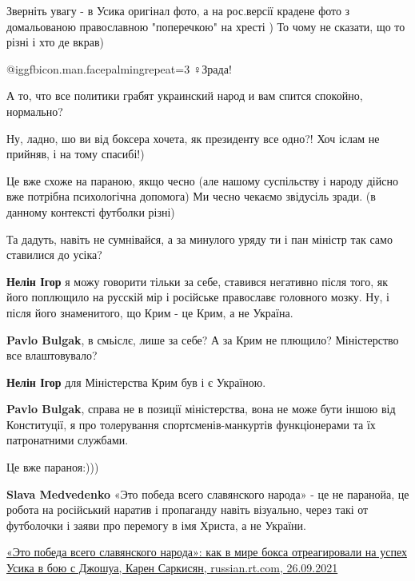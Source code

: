 \begin{itemize}
Зверніть увагу - в Усика оригінал фото, а на рос.версії крадене фото з
домальованою православною "поперечкою" на хресті ) То чому не сказати, що то
різні і хто де вкрав)

 @igg{fbicon.man.facepalming}{repeat=3} ♀️Зрада!

А то, что все политики грабят украинский народ и вам спится спокойно, нормально?


Ну, ладно, шо ви від боксера хочета, як президенту все одно?! Хоч іслам не прийняв, і на тому спасибі!)



Це вже схоже на параною, якщо чесно (але нашому суспільству і народу дійсно вже потрібна психологічна допомога)
Ми чесно чекаємо звідусіль зради. (в данному контексті футболки різні)


Та дадуть, навіть не сумнівайся, а за минулого уряду ти і пан міністр так само
ставилися до усіка?

\begin{itemize} %
\textbf{Нелін Ігор} я можу говорити тільки за себе, ставився негативно після того, як його поплющило на русскій мір і російське православє головного мозку. Ну, і після його знаменитого, що Крим - це Крим, а не Україна.

\textbf{Pavlo Bulgak}, в смьіслє, лише за себе? А за Крим не плющило? Міністерство все влаштовувало?

\textbf{Нелін Ігор} для Міністерства Крим був і є Україною.

\textbf{Pavlo Bulgak}, справа не в позиції міністерства, вона не може бути іншою від Конституції, я про толерування спортсменів-манкуртів функціонерами та їх патронатними службами.
\end{itemize} %

Це вже параноя:)))

\begin{itemize} %
\textbf{Slava Medvedenko} «Это победа всего славянского народа» - це не паранойа, це робота на російський наратив і пропаганду навіть візуально, через такі от футболочки і заяви про перемогу в імя Христа, а не України.

\href{https://russian.rt.com/sport/article/911140-usik-dzhoshua-ocenka}{%
«Это победа всего славянского народа»: как в мире бокса отреагировали на успех Усика в бою с Джошуа, %
Карен Саркисян, russian.rt.com, 26.09.2021%
}


\end{itemize}
\end{itemize}
